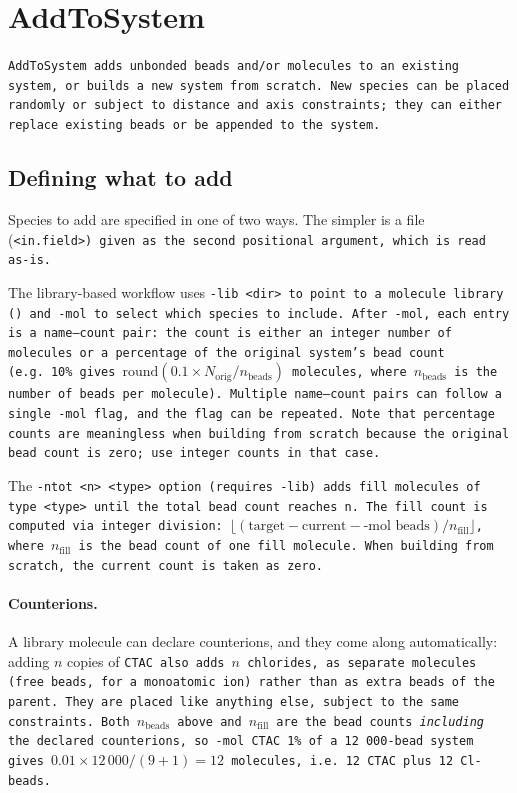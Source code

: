 \section{AddToSystem} \label{sec:AddToSystem}

\tt{AddToSystem} adds unbonded beads and/or molecules to an existing system,
or builds a new system from scratch. New species can be placed randomly or
subject to distance and axis constraints; they can either replace existing
beads or be appended to the system.

\subsection{Defining what to add}

Species to add are specified in one of two ways. The simpler is a \field file
(\tt{<in.field>}) given as the second positional argument, which is read as-is.

The library-based workflow uses \tt{-lib <dir>} to point to a molecule library
() and \tt{-mol} to select which species to include. After
\tt{-mol}, each entry is a name--count pair: the count is either an integer
number of molecules or a percentage of the original system's bead count (e.g.\
\tt{10\%} gives $\text{round}(0.1 \times N_\text{orig} / n_\text{beads})$
molecules, where $n_\text{beads}$ is the number of beads per molecule).
Multiple name--count pairs can follow a single \tt{-mol} flag, and the flag can
be repeated. Note that percentage counts are meaningless when building from
scratch because the original bead count is zero; use integer counts in that
case.

The \tt{-ntot <n> <type>} option (requires \tt{-lib}) adds fill molecules of
type \tt{<type>} until the total bead count reaches \tt{n}. The fill count is
computed via integer division: $\lfloor (\text{target} - \text{current} -
\text{-mol beads}) / n_\text{fill} \rfloor$, where $n_\text{fill}$ is the
bead count of one fill molecule. When building from scratch, the current count
is taken as zero.

\paragraph{Counterions.}
A library molecule can declare counterions, and they come along automatically:
adding $n$ copies of \tt{CTAC} also adds $n$ chlorides, as separate molecules
(free beads, for a monoatomic ion) rather than as extra beads of the parent.
They are placed like anything else, subject to the same constraints. Both
$n_\text{beads}$ above and $n_\text{fill}$ are the bead counts \emph{including}
the declared counterions, so \tt{-mol CTAC 1\%} of a 12\,000-bead system gives
$0.01 \times 12\,000 / (9 + 1) = 12$ molecules, i.e.\ 12 \tt{CTAC} plus 12
\tt{Cl-} beads.

